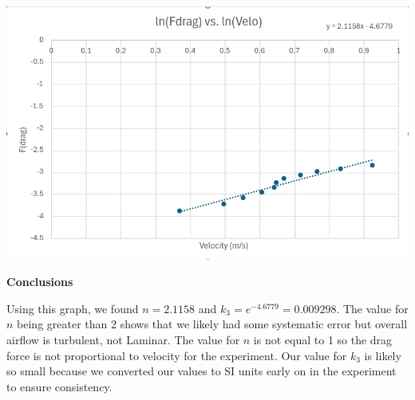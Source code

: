 \documentclass[12pt]{article}
\begin{document}
\begin{center}
    \includegraphics[scale=0.60]{lnv_lndrag.png}
\end{center}

\textbf{Conclusions}

Using this graph, we found $n = 2.1158$ and $k_3 = e^{-4.6779} = 0.009298$.
The value for $n$ being greater than 2 shows that we likely had some systematic error but overall airflow is turbulent, not Laminar.
The value for $n$ is not equal to 1 so the drag force is not proportional to velocity for the experiment.
Our value for $k_3$ is likely so small because we converted our values to SI units early on in the experiment to ensure
consistency.
\end{document}
